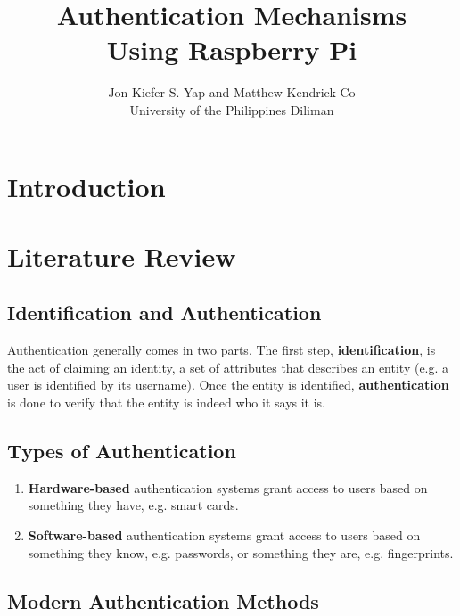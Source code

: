 \documentclass[a4paper, 12pt]{article}
\begin{document}
\title{Authentication Mechanisms \\ Using Raspberry Pi}
\author{Jon Kiefer S. Yap and Matthew Kendrick Co \\
University of the Philippines Diliman}
\maketitle

\begin{abstract}
\end{abstract}

\section{Introduction}

\section{Literature Review}
\subsection{Identification and Authentication}

Authentication generally comes in two parts. The first step, \textbf{identification}, is the act of claiming an identity, a set of attributes that describes an entity (e.g. a user is identified by its username). Once the entity is identified, \textbf{authentication} is done to verify that the entity is indeed who it says it is. \cite{Pasupathinathan2009}

\subsection{Types of Authentication}
\begin{enumerate}
    \item \textbf{Hardware-based} authentication systems grant access to users based on something they have, e.g. smart cards.
    \item \textbf{Software-based} authentication systems grant access to users based on something they know, e.g. passwords, or something they are, e.g. fingerprints.
\end{enumerate}

\subsection{Modern Authentication Methods}
\end{document}
